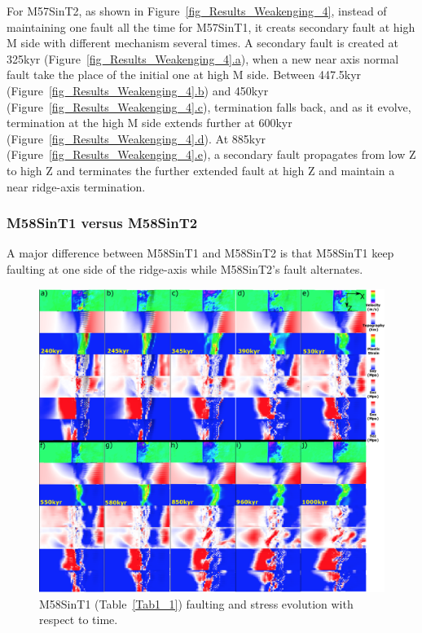 For M57SinT2, as shown in Figure~\hyperref[fig_Results_Weakenging_4]{\ref{fig_Results_Weakenging_4}}, instead of maintaining one fault all the time for M57SinT1, it creats secondary fault at high M side with different mechanism several times. A secondary fault is created at 325kyr (Figure~\hyperref[fig_Results_Weakenging_4]{\ref{fig_Results_Weakenging_4}.a}), when a new near axis normal fault take the place of the initial one at high M side. Between 447.5kyr (Figure~\hyperref[fig_Results_Weakenging_4]{\ref{fig_Results_Weakenging_4}.b}) and 450kyr (Figure~\hyperref[fig_Results_Weakenging_4]{\ref{fig_Results_Weakenging_4}.c}), termination falls back, and as it evolve, termination at the high M side extends further at 600kyr (Figure~\hyperref[fig_Results_Weakenging_4]{\ref{fig_Results_Weakenging_4}.d}). At 885kyr (Figure~\hyperref[fig_Results_Weakenging_4]{\ref{fig_Results_Weakenging_4}.e}), a secondary fault propagates from low Z to high Z and terminates the further extended fault at high Z and maintain a near ridge-axis termination.

\subsubsection{M58SinT1 versus M58SinT2}

A major difference between M58SinT1 and M58SinT2 is that M58SinT1 keep faulting at one side of the ridge-axis while M58SinT2's fault alternates.

\begin{figure}[h]
 \centering
  \includegraphics[width=1.0\textwidth]{fig_Results_Weakening_5_M58SinT1_time_evolution.eps}
 \caption{M58SinT1 (Table~\hyperref[Tab1_1]{\ref{Tab1_1}}) faulting and stress evolution with respect to time.}
\label{fig_Results_Weakenging_5}
\end{figure}

